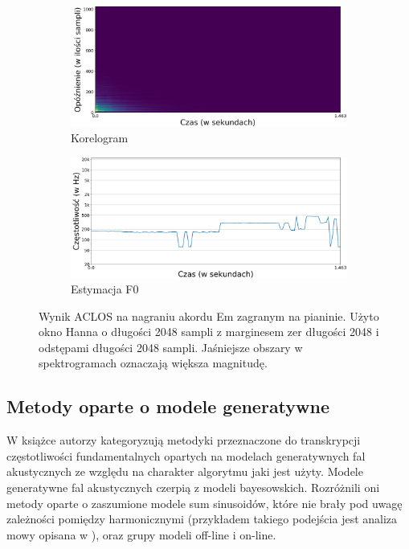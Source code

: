 \documentclass[12pt,a4paper,twoside]{mwart}
\begin{document}
\begin{figure}[H]
  \begin{subfigure}{0.5\textwidth}
    \includegraphics[width=1.\linewidth]{images/Em/Aclos_corelogram_cropped.png}
    \caption{Korelogram}
  \end{subfigure}
  \begin{subfigure}{0.49\textwidth}
    \includegraphics[width=1.\linewidth]{images/Em/Aclos_estymacja_cropped.png}
    \caption{Estymacja F0}
    \label{fig:multi:aclos:estimation}
  \end{subfigure}
  \caption{Wynik ACLOS na nagraniu akordu Em zagranym na pianinie. Użyto okno Hanna o długości 2048 sampli z marginesem zer długości 2048 i odstępami długości 2048 sampli. Jaśniejsze obszary w spektrogramach oznaczają większa magnitudę.}
  \label{fig:multi:aclos}
\end{figure}

\subsection{Metody oparte o modele generatywne}
W książce 
\cite[203-227]{Transcription:Anssi:SignalProcessingMethods} 
autorzy kategoryzują metodyki przeznaczone do transkrypcji częstotliwości fundamentalnych opartych na modelach generatywnych fal akustycznych ze względu na charakter algorytmu jaki jest użyty. Modele generatywne fal akustycznych czerpią z modeli bayesowskich. Rozróżnili oni metody oparte o zaszumione modele sum sinusoidów, które nie brały pod uwagę zależności pomiędzy harmonicznymi (przykładem takiego podejścia jest analiza mowy opisana w 
\cite[744-745]{Transcription:McAulay:SinusoidalRepresentationF0}
), oraz grupy modeli off-line i on-line.
\end{document}
